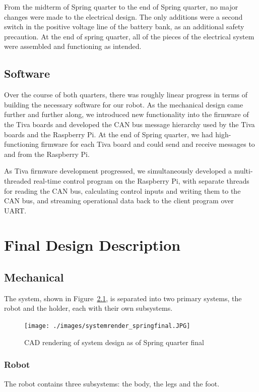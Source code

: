 \documentclass{report}
\begin{document}
From the midterm of Spring quarter to the end of Spring quarter, no major changes were made to the electrical design. The only additions were a second switch in the positive voltage line of the battery bank, as an additional safety precaution. At the end of spring quarter, all of the pieces of the electrical system were assembled and functioning as intended. 


\section[Software]{Software}
Over the course of both quarters, there was roughly linear progress in terms of building the necessary software for our robot. As the mechanical design came further and further along, we introduced new functionality into the firmware of the Tiva boards and developed the CAN bus message hierarchy used by the Tiva boards and the Raspberry Pi. At the end of Spring quarter, we had high-functioning firmware for each Tiva board and could send and receive messages to and from the Raspberry Pi.

As Tiva firmware development progressed, we simultaneously developed a multi-threaded real-time control program on the Raspberry Pi, with separate threads for reading the CAN bus, calculating control inputs and writing them to the CAN bus, and streaming operational data back to the client program over UART.

\chapter[Final Design Description]{Final Design Description}
\section[Mechanical]{Mechanical}
The system, shown in Figure~\ref{fig:systemrender_SF}, is separated into two primary systems, the robot and the holder, each with their own subsystems.

\begin{figure}[H]
\centering
\texttt{[image: ./images/systemrender\_springfinal.JPG]}
\caption[CAD rendering of system design as of Spring quarter final]{CAD rendering of system design as of Spring quarter final}
\label{fig:systemrender_SF}
\end{figure}

\subsection[Robot]{Robot}
The robot contains three subsystems: the body, the legs and the foot.
\end{document}
